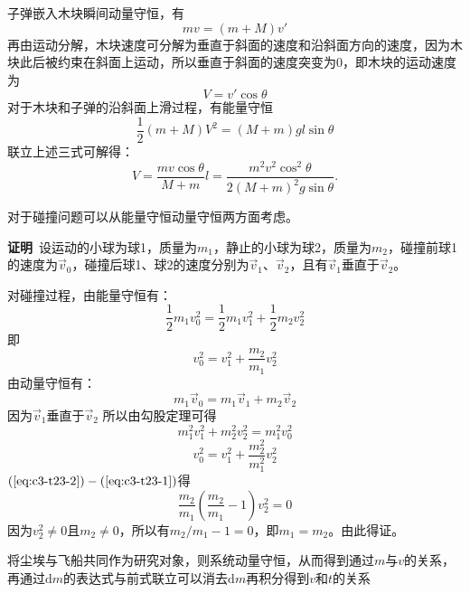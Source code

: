 \documentclass[b5paper,opensource,sourcefont,parskip]{qyxf-book}
\newcommand{\di}[1]{\mathrm{d}#1}
\begin{document}
\solve 子弹嵌入木块瞬间动量守恒，有
\begin{equation*}
mv=(m+M)v'
\end{equation*}
再由运动分解，木块速度可分解为垂直于斜面的速度和沿斜面方向的速度，因为木块此后被约束在斜面上运动，所以垂直于斜面的速度突变为$0$，即木块的运动速度为
\begin{equation*}
V=v'\cos\theta
\end{equation*}
对于木块和子弹的沿斜面上滑过程，有能量守恒
\begin{equation*}
\frac{1}{2}(m+M)V^2=(M+m)gl\sin\theta
\end{equation*}
联立上述三式可解得：
\begin{equation*}
V=\frac{mv\cos\theta}{M+m}
l=\frac{m^2v^2\cos^2\theta}{2(M+m)^2g\sin\theta}.
\end{equation*}


\analysis 对于碰撞问题可以从能量守恒动量守恒两方面考虑。

\noindent\textbf{证明}\ 设运动的小球为球1，质量为$m_1$，静止的小球为球2，质量为$m_2$，碰撞前球1的速度为$\vec{v}_0$，碰撞后球1、球2的速度分别为$\vec{v}_1$、$\vec{v}_2$，且有$\vec{v}_1$垂直于$\vec{v}_2$。
			
对碰撞过程，由能量守恒有：
\begin{equation*}
\frac{1}{2}m_1v_0^2=\frac{1}{2}m_1v_1^2+\frac{1}{2}m_2v_2^2
\end{equation*}
即
\begin{equation}\label{eq:c3-t23-1}
v_0^2=v_1^2+\frac{m_2}{m_1}v_2^2
\end{equation}
由动量守恒有：
\begin{equation*}
m_1\vec{v}_0=m_1\vec{v}_1+m_2\vec{v}_2
\end{equation*}
因为$\vec{v}_1$垂直于$\vec{v}_2$
所以由勾股定理可得
\begin{equation*}
m_1^2 v_1^2 + m_2^2 v_2^2 = m_1^2 v_0^2
\end{equation*}
\begin{equation}\label{eq:c3-t23-2}
v_0^2=v_1^2+\frac{m_2^2}{m_1^2}v_2^2
\end{equation}
$(\ref{eq:c3-t23-2})-(\ref{eq:c3-t23-1})$得
\begin{equation*}
\frac{m_2}{m_1}(\frac{m_2}{m_1}-1)v_2^2=0
\end{equation*}
因为$v_2^2 \ne 0$且$m_2 \ne 0$，所以有$m_2/m_1-1=0$，即$m_1=m_2$。由此得证。


\analysis 将尘埃与飞船共同作为研究对象，则系统动量守恒，从而得到通过$m$与$v$的关系，再通过$\di m$的表达式与前式联立可以消去$\di m$再积分得到$v$和$t$的关系
			
\end{document}
